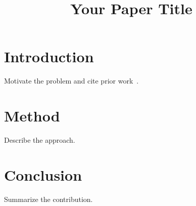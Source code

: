 \documentclass{iac}
\title{Your Paper Title}
\begin{document}
\maketitle


\section{Introduction}
Motivate the problem and cite prior work~\cite{knuth1984}.

\section{Method}
Describe the approach.

\section{Conclusion}
Summarize the contribution.

\printbibliography
\end{document}

